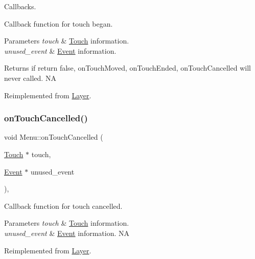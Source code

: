 Callbacks. 

Callback function for touch began.


\begin{DoxyParams}{Parameters}
{\em touch} & \hyperlink{classTouch}{Touch} information. \\
\hline
{\em unused\+\_\+event} & \hyperlink{classEvent}{Event} information. \\
\hline
\end{DoxyParams}
\begin{DoxyReturn}{Returns}
if return false, on\+Touch\+Moved, on\+Touch\+Ended, on\+Touch\+Cancelled will never called.  NA 
\end{DoxyReturn}


Reimplemented from \hyperlink{classLayer_abe632dc131bdeb3d603090d4d31db25c}{Layer}.

\mbox{\label{classMenu_a19ffec24a2ec30dd290354e0e0e3aa9a}} 
\subsubsection{\texorpdfstring{on\+Touch\+Cancelled()}{onTouchCancelled()}\hspace{0.1cm}{\footnotesize\ttfamily [1/2]}}
{\footnotesize\ttfamily void Menu\+::on\+Touch\+Cancelled (\begin{DoxyParamCaption}\item[{\hyperlink{classTouch}{Touch} $\ast$}]{touch,  }\item[{\hyperlink{classEvent}{Event} $\ast$}]{unused\+\_\+event }\end{DoxyParamCaption})\hspace{0.3cm}{\ttfamily [override]}, {\ttfamily [virtual]}}

Callback function for touch cancelled.


\begin{DoxyParams}{Parameters}
{\em touch} & \hyperlink{classTouch}{Touch} information. \\
\hline
{\em unused\+\_\+event} & \hyperlink{classEvent}{Event} information.  NA \\
\hline
\end{DoxyParams}


Reimplemented from \hyperlink{classLayer_a9254f82e75c109b81c392d415ecf7b3d}{Layer}.

\mbox{\label{classMenu_acb29e6ae77c5acba03ac48c5f1b6b23a}} 
